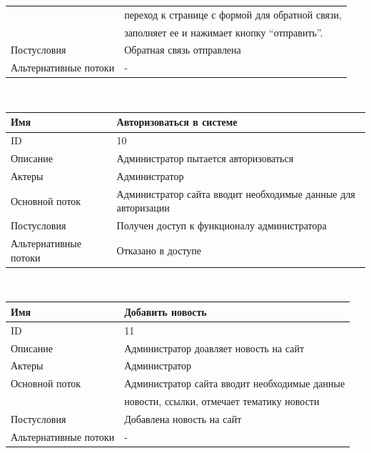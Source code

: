 \begin{center}
\begin{tabular}{|l|l|}
        & переход к странице с формой для обратной связи,             \\
        & заполняет ее и нажимает кнопку “отправить”.                 \\
        \hline
        Постусловия           & Обратная связь отправлена                                   \\
        \hline
        Альтернативные потоки & -                                                           \\
        \hline
    \end{tabular}\\
    \vspace{0.5cm}
    \begin{tabular}{|l|l|}
        \hline
        Имя                   & Авторизоваться в системе                                      \\
        \hline
        ID                    & 10                                                            \\
        \hline
        Описание              & Администратор пытается авторизоваться                         \\
        \hline
        Актеры                & Администратор                                                 \\
        \hline
        Основной поток        & Администратор сайта вводит необходимые данные для авторизации \\
        \hline
        Постусловия           & Получен доступ к функционалу администратора                   \\
        \hline
        Альтернативные потоки & Отказано в доступе                                            \\
        \hline
    \end{tabular}\\
    \vspace{0.5cm}
    \begin{tabular}{|l|l|}
        \hline
        Имя                   & Добавить новость                              \\
        \hline
        ID                    & 11                                            \\
        \hline
        Описание              & Администратор доавляет новость на сайт        \\
        \hline
        Актеры                & Администратор                                 \\
        \hline
        Основной поток        & Администратор сайта вводит необходимые данные \\
        & новости, ссылки, отмечает тематику новости    \\
        \hline
        Постусловия           & Добавлена новость на сайт                     \\
        \hline
        Альтернативные потоки & -                                             \\
        \hline
    \end{tabular}\\
\end{center}
